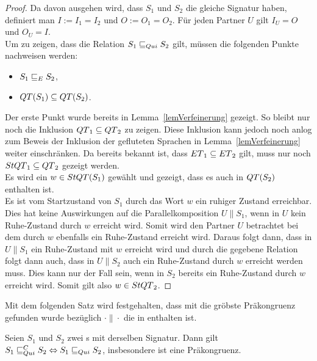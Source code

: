 \begin{proof}
  Da davon ausgehen wird, dass $S_1$ und $S_2$ die gleiche Signatur haben,
  definiert man $I:=I_1=I_2$ und $O:=O_1=O_2$. Für jeden Partner $U$ gilt
  $I_U=O$ und $O_U=I$.\\
  Um zu zeigen, dass die Relation $S_1\sqsubseteq _{Qui} S_2$ gilt, müssen die
  folgenden Punkte nachweisen werden:
  \begin{itemize}
    \item $S_1\sqsubseteq _E S_2$,
    \item $QT{}(S_1)\subseteq QT{}(S_2)$.
  \end{itemize}
  Der erste Punkt wurde bereits in Lemma~\ref{lemVerfeinerung}
  gezeigt. So bleibt nur noch die Inklusion $QT{}_1\subseteq QT{}_2$ zu
  zeigen. Diese Inklusion kann jedoch noch anlog zum Beweis der Inklusion
  der gefluteten Sprachen in Lemma~\ref{lemVerfeinerung} weiter einschränken.
  Da bereits bekannt ist, dass $ET{}_1\subseteq ET{}_2$ gilt, muss nur
  noch $StQT{}_1\subseteq QT{}_2$ gezeigt werden.\\
  Es wird ein $w\in StQT{}(S_1)$ gewählt und gezeigt, dass es auch in $QT{}(S_2)$
  enthalten ist.\\
  Es ist vom Startzustand von $S_1$ durch das Wort $w$ ein ruhiger Zustand
  erreichbar. Dies hat keine Auswirkungen auf die Parallelkomposition $U\|S_1$,
  wenn in $U$ kein Ruhe-Zustand durch $w$ erreicht wird. Somit wird
  den Partner $U$ betrachtet bei dem durch $w$ ebenfalls ein Ruhe-Zustand erreicht wird.
  Daraus folgt dann, dass in $U\|S_1$ ein Ruhe-Zustand mit $w$ erreicht wird
  und durch die gegebene Relation folgt dann auch, dass in $U\|S_2$ auch ein
  Ruhe-Zustand durch $w$ erreicht werden muss. Dies kann nur der Fall sein,
  wenn in $S_2$ bereits ein Ruhe-Zustand durch $w$ erreicht wird. Somit gilt
  also $w\in StQT{}_2$.
\end{proof}

Mit dem folgenden Satz wird festgehalten, dass mit \QRel{} die gröbste
Präkongruenz gefunden wurde bezüglich $\cdot\|\cdot$ die in \QBRel{} enthalten
ist.

\begin{satz}
  \label{satzQuiFullAbst}
  Seien $S_1$ und $S_2$ zwei \EIO{}s mit derselben Signatur. Dann gilt
  $S_1\sqsubseteq _{Qui}^C S_2\Leftrightarrow S_1\sqsubseteq _{Qui} S_2$, insbesondere ist \QRel{} eine
  Präkongruenz.
\end{satz}

